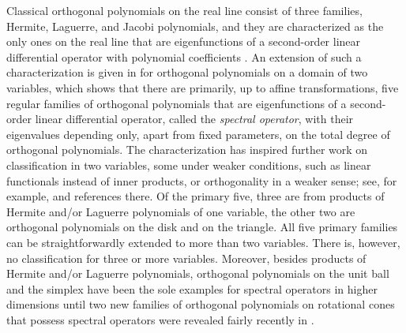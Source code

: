\documentclass{amsart}
\theoremstyle{remark}
\begin{document}
Classical orthogonal polynomials on the real line consist of three families, Hermite, Laguerre, and Jacobi 
polynomials, and they are characterized as the only ones on the real line that are eigenfunctions of a 
second-order linear differential operator with polynomial coefficients \cite{B}. An extension of such a 
characterization is given in \cite{KrSh} for orthogonal polynomials on a domain of two variables, which 
shows that there are primarily, up to affine transformations, five regular families of orthogonal polynomials 
that are eigenfunctions of a second-order linear differential operator, called the {\it spectral operator}, with 
their eigenvalues depending only, apart from fixed parameters, on the total degree of orthogonal polynomials. 
The characterization has inspired further work on classification in two variables, some under weaker 
conditions, such as linear functionals instead of inner products, or orthogonality in a weaker sense; see, 
for example, \cite{AGRZ, FPP, KKL, KLL, Su} and references there. Of the primary five, three are from 
products of Hermite and/or Laguerre polynomials of one variable, the other two are orthogonal polynomials 
on the disk and on the triangle. All five primary families can be straightforwardly extended to more than two 
variables. There is, however, no classification for three or more variables. Moreover, besides products of 
Hermite and/or Laguerre polynomials, orthogonal polynomials on the unit ball and the simplex have been 
the sole examples for spectral operators in higher dimensions until two new families of orthogonal polynomials 
on rotational cones that possess spectral operators were revealed fairly recently in \cite{X21}.
\end{document}
